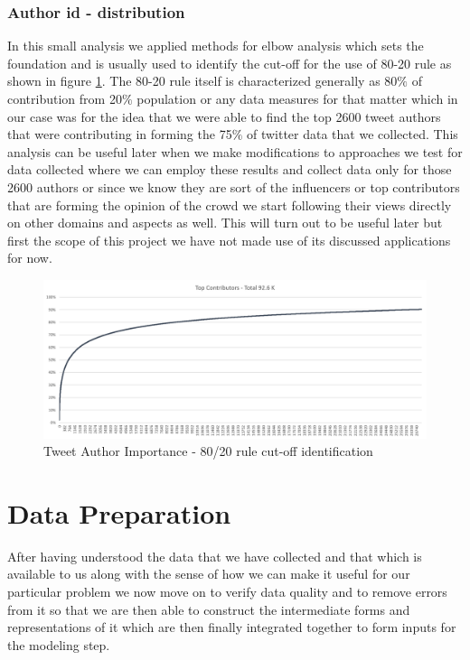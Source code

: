 \documentclass[sigconf, nonacm]{acmart}
\begin{document}
\subsubsection{Author id - distribution}
In this small analysis we applied methods for elbow analysis which sets the foundation and is usually used to identify the cut-off for the use of 80-20 rule as shown in figure \ref{author}. The 80-20 rule itself is characterized generally as 80$\%$ of contribution from 20$\%$ population or any data measures for that matter which in our case was for the idea that we were able to find the top 2600 tweet authors that were contributing in forming the 75$\%$ of twitter data that we collected. This analysis can be useful later when we make modifications to approaches we test for data collected where we can employ these results and collect data only for those 2600 authors or since we know they are sort of the influencers or top contributors that are forming the opinion of the crowd we start following their views directly on other domains and aspects as well. This will turn out to be useful later but first the scope of this project we have not made use of its discussed applications for now.

\begin{figure}[H]
  \centering
  \includegraphics[width=\linewidth]{images/author.png}
  \caption{Tweet Author Importance - 80/20 rule cut-off identification}
  \label{author}
\end{figure}



\section{Data Preparation}
After having understood the data that we have collected and that which is available to us along with the sense of how we can make it useful for our particular problem we now move on to verify data quality and to remove errors from it so that we are then able to construct the intermediate forms and representations of it which are then finally integrated together to form inputs for the modeling step.
\end{document}
